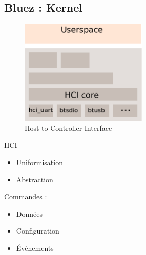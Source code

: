 \subsection{Bluez : Kernel}

\begin{frame}
\begin{minipage}[t]{0.60\linewidth}
	\begin{figure}
		\includegraphics[height=5cm]{bluez_kernel_hci.png}
		\caption{Host to Controller Interface}
	\end{figure}
\end{minipage}
\begin{minipage}[t]{0.30\linewidth}
	\begin{block}{HCI}
		\begin{itemize}
			\item Uniformisation
			\item Abstraction
		\end{itemize}
		Commandes : 
		\begin{itemize}
			\item Données
			\item Configuration
			\item Évènements
		\end{itemize}
	\end{block}
\end{minipage}
\end{frame}

